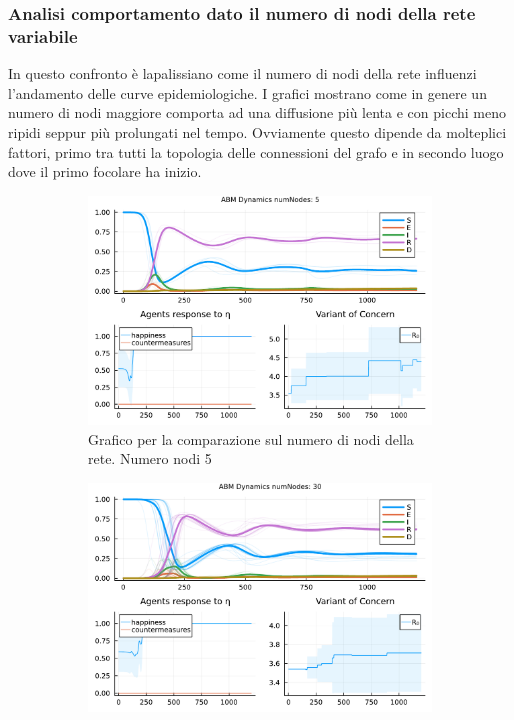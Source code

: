 \subsubsection{Analisi comportamento dato il numero di nodi della rete variabile}
In questo confronto è lapalissiano come il numero di nodi della rete influenzi l'andamento delle curve epidemiologiche. 
I grafici mostrano come in genere un numero di nodi maggiore comporta ad una diffusione più lenta e con picchi meno ripidi
seppur più prolungati nel tempo. Ovviamente questo dipende da molteplici fattori, primo tra tutti la topologia delle connessioni 
del grafo e in secondo luogo dove il primo focolare ha inizio. 

\begin{figure}[!hb]
	\centering
	\begin{subfigure}[b]{0.45\textwidth}
		\centering
		\includegraphics[width=\textwidth]{img/SocialNetworkABM_1_NN.pdf}
		\caption{Grafico per la comparazione sul numero di nodi della rete. Numero nodi 5}
		\label{fig:comparison_numberOfNodes_5}
	\end{subfigure}
	\hfill
	\begin{subfigure}[b]{0.45\textwidth}
		\centering
		\includegraphics[width=\textwidth]{img/SocialNetworkABM_2_NN.pdf}

\end{subfigure}
\end{figure}
